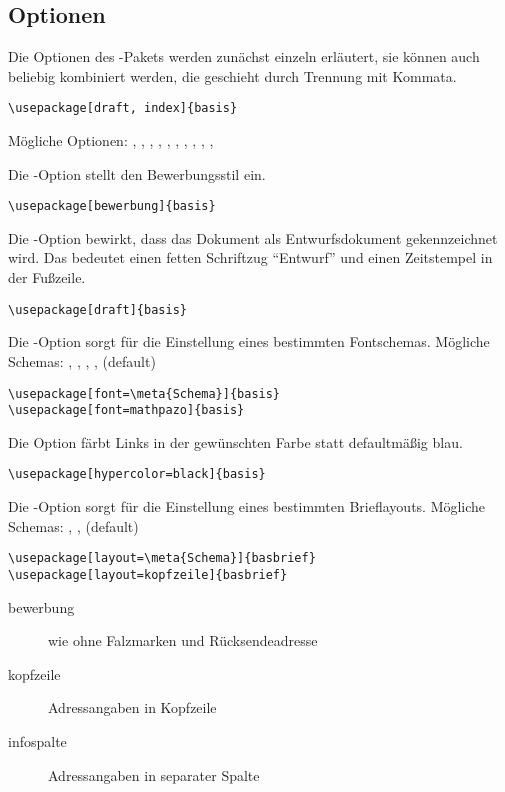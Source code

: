 \subsection{Optionen}
\label{sec:user:options}

Die Optionen des -Pakets werden zunächst einzeln erläutert, sie können
auch beliebig kombiniert werden, die geschieht durch Trennung mit Kommata.

\verb#\usepackage[draft, index]{basis}#

Mögliche Optionen: , , , , , , , , , , 


Die -Option stellt den Bewerbungsstil ein.

\verb#\usepackage[bewerbung]{basis}#


Die -Option bewirkt, dass das Dokument als Entwurfsdokument gekennzeichnet wird.
Das bedeutet einen fetten Schriftzug "`Entwurf"' und einen Zeitstempel in der Fußzeile.

\verb#\usepackage[draft]{basis}#


Die -Option sorgt für die Einstellung eines bestimmten Fontschemas.
Mögliche Schemas: , , , ,  (default)

\verb#\usepackage[font=\meta{Schema}]{basis}#\\
\verb#\usepackage[font=mathpazo]{basis}#


Die Option  färbt Links in der gewünschten Farbe statt defaultmäßig blau.

\verb#\usepackage[hypercolor=black]{basis}#


Die -Option sorgt für die Einstellung eines bestimmten Brieflayouts.
Mögliche Schemas: , ,  (default)

\verb#\usepackage[layout=\meta{Schema}]{basbrief}#\\
\verb#\usepackage[layout=kopfzeile]{basbrief}#

\begin{description}
		\item [bewerbung] wie  ohne Falzmarken und Rücksendeadresse
		\item [kopfzeile] Adressangaben in Kopfzeile
		\item [infospalte] Adressangaben in separater Spalte
\end{description}

